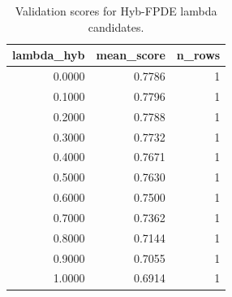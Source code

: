 \begin{table}[t]
\caption{Validation scores for Hyb-FPDE lambda candidates.}
\label{tab:lambda_distribution_computed}
\centering
\begin{tabular}{rrr}
\toprule
lambda\_hyb & mean\_score & n\_rows \\
\midrule
0.0000 & 0.7786 & 1 \\
0.1000 & 0.7796 & 1 \\
0.2000 & 0.7788 & 1 \\
0.3000 & 0.7732 & 1 \\
0.4000 & 0.7671 & 1 \\
0.5000 & 0.7630 & 1 \\
0.6000 & 0.7500 & 1 \\
0.7000 & 0.7362 & 1 \\
0.8000 & 0.7144 & 1 \\
0.9000 & 0.7055 & 1 \\
1.0000 & 0.6914 & 1 \\
\bottomrule
\end{tabular}

\end{table}
